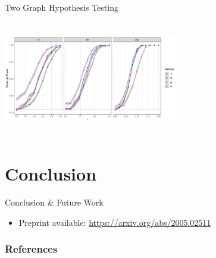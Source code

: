 \documentclass[handout]{beamer}
\begin{document}
\begin{frame}{Two Graph Hypothesis Testing}
    \begin{center}
        \includegraphics[width = 3in, height = 2in]{empirical_power_oracle_correction_variable_t.pdf}
    \end{center}
\end{frame}


\section{Conclusion}

\begin{frame}{Conclusion \& Future Work}
    \begin{itemize}
        \item Preprint available: \url{https://arxiv.org/abs/2005.02511}
    \end{itemize}
\end{frame}


\nocite{*}
\begin{frame}[t,allowframebreaks]
  \frametitle{References}
  \printbibliography
 \end{frame}
\end{document}

